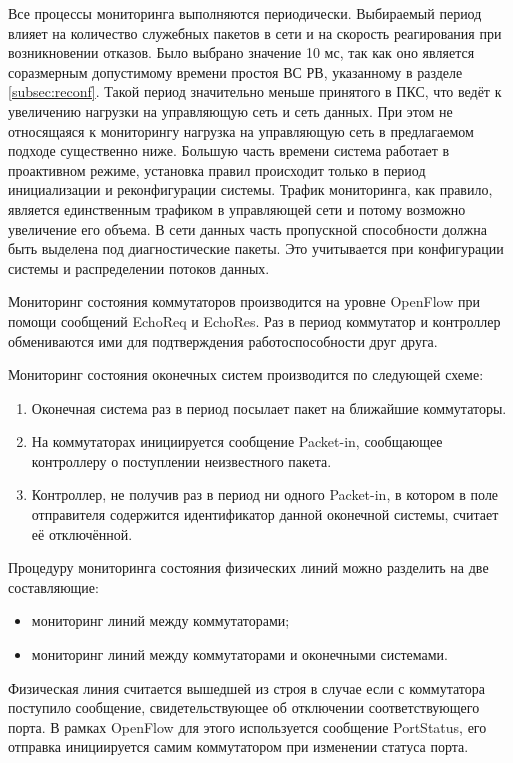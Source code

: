 \documentclass[12pt, a4paper]{article}
\begin{document}
Все процессы мониторинга выполняются периодически. Выбираемый период влияет на количество служебных пакетов в сети и на скорость реагирования при возникновении отказов. Было выбрано значение 10 мс, так как оно является соразмерным допустимому времени простоя ВС РВ, указанному в разделе \ref{subsec:reconf}. Такой период значительно меньше принятого в ПКС, что ведёт к увеличению нагрузки на управляющую сеть и сеть данных. При этом не относящаяся к мониторингу нагрузка на управляющую сеть в предлагаемом подходе существенно ниже. Большую часть времени система работает в проактивном режиме, установка правил происходит только в период инициализации и реконфигурации системы. Трафик мониторинга, как правило, является единственным трафиком в управляющей сети и потому возможно увеличение его объема. В сети данных часть пропускной способности должна быть выделена под диагностические пакеты. Это учитывается при конфигурации системы и распределении потоков данных.

Мониторинг состояния коммутаторов производится на уровне OpenFlow при помощи сообщений EchoReq и EchoRes. Раз в период коммутатор и контроллер обмениваются ими для подтверждения работоспособности друг друга.

Мониторинг состояния оконечных систем производится по следующей схеме:
\begin{enumerate}
	\item Оконечная система раз в период посылает пакет на ближайшие коммутаторы.
	\item На коммутаторах инициируется сообщение Packet-in, сообщающее контроллеру о поступлении неизвестного пакета.
	\item Контроллер, не получив раз в период ни одного Packet-in, в котором в поле отправителя содержится идентификатор данной оконечной системы, считает её отключённой.
\end{enumerate}


Процедуру мониторинга состояния физических линий можно разделить на две составляющие: 
\begin{itemize}
	\item мониторинг линий между коммутаторами;
	\item мониторинг линий между коммутаторами и оконечными системами.
\end{itemize}

Физическая линия считается вышедшей из строя в случае если с коммутатора поступило сообщение, свидетельствующее об отключении соответствующего порта. В рамках OpenFlow для этого используется сообщение PortStatus, его отправка инициируется самим коммутатором при изменении статуса порта.
\end{document}
